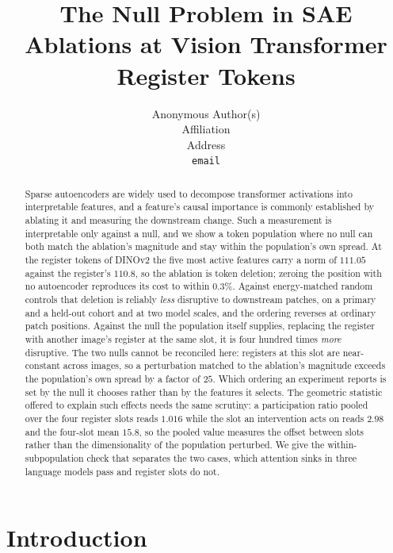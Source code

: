 \documentclass{article}
\title{The Null Problem in SAE Ablations at Vision Transformer Register Tokens}
\author{%
  Anonymous Author(s) \\
  Affiliation \\
  Address \\
  \texttt{email} \\
}
\begin{document}
\maketitle

\begin{abstract}
Sparse autoencoders are widely used to decompose transformer activations into interpretable features, and a feature's causal importance is commonly established by ablating it and measuring the downstream change. Such a measurement is interpretable only against a null, and we show a token population where no null can both match the ablation's magnitude and stay within the population's own spread. At the register tokens of DINOv2 the five most active features carry a norm of $111.05$ against the register's $110.8$, so the ablation is token deletion; zeroing the position with no autoencoder reproduces its cost to within $0.3\%$. Against energy-matched random controls that deletion is reliably \emph{less} disruptive to downstream patches, on a primary and a held-out cohort and at two model scales, and the ordering reverses at ordinary patch positions. Against the null the population itself supplies, replacing the register with another image's register at the same slot, it is four hundred times \emph{more} disruptive. The two nulls cannot be reconciled here: registers at this slot are near-constant across images, so a perturbation matched to the ablation's magnitude exceeds the population's own spread by a factor of $25$. Which ordering an experiment reports is set by the null it chooses rather than by the features it selects. The geometric statistic offered to explain such effects needs the same scrutiny: a participation ratio pooled over the four register slots reads $1.016$ while the slot an intervention acts on reads $2.98$ and the four-slot mean $15.8$, so the pooled value measures the offset between slots rather than the dimensionality of the population perturbed. We give the within-subpopulation check that separates the two cases, which attention sinks in three language models pass and register slots do not.
\end{abstract}

\section{Introduction}
\end{document}

